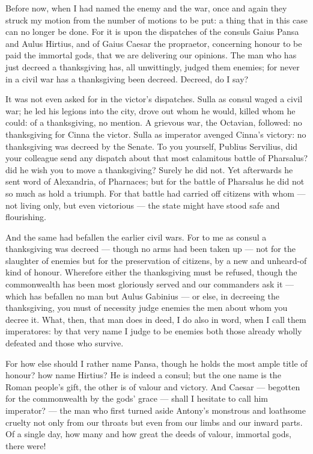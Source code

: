  Before now, when I had named the enemy and the war, once and again they struck my motion from the number of motions to be put: a thing that in this case can no longer be done. For it is upon the dispatches of the consuls Gaius Pansa and Aulus Hirtius, and of Gaius Caesar the propraetor, concerning honour to be paid the immortal gods, that we are delivering our opinions. The man who has just decreed a thanksgiving has, all unwittingly, judged them enemies; for never in a civil war has a thanksgiving been decreed. Decreed, do I say?

 It was not even asked for in the victor's dispatches. Sulla as consul waged a civil war; he led his legions into the city, drove out whom he would, killed whom he could: of a thanksgiving, no mention. A grievous war, the Octavian, followed: no thanksgiving for Cinna the victor. Sulla as imperator avenged Cinna's victory: no thanksgiving was decreed by the Senate. To you yourself, Publius Servilius, did your colleague send any dispatch about that most calamitous battle of Pharsalus? did he wish you to move a thanksgiving? Surely he did not. Yet afterwards he sent word of Alexandria, of Pharnaces; but for the battle of Pharsalus he did not so much as hold a triumph. For that battle had carried off citizens with whom --- not living only, but even victorious --- the state might have stood safe and flourishing.

 And the same had befallen the earlier civil wars. For to me as consul a thanksgiving was decreed --- though no arms had been taken up --- not for the slaughter of enemies but for the preservation of citizens, by a new and unheard-of kind of honour. Wherefore either the thanksgiving must be refused, though the commonwealth has been most gloriously served and our commanders ask it --- which has befallen no man but Aulus Gabinius --- or else, in decreeing the thanksgiving, you must of necessity judge enemies the men about whom you decree it. What, then, that man does in deed, I do also in word, when I call them imperatores: by that very name I judge to be enemies both those already wholly defeated and those who survive.

 For how else should I rather name Pansa, though he holds the most ample title of honour? how name Hirtius? He is indeed a consul; but the one name is the Roman people's gift, the other is of valour and victory. And Caesar --- begotten for the commonwealth by the gods' grace --- shall I hesitate to call him imperator? --- the man who first turned aside Antony's monstrous and loathsome cruelty not only from our throats but even from our limbs and our inward parts. Of a single day, how many and how great the deeds of valour, immortal gods, there were!

